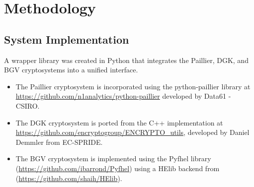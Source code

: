 \section{Methodology}
\label{sec:chapter_3}


\subsection{System Implementation}
A wrapper library was created in Python that integrates the Paillier, DGK, and BGV cryptosystems into a unified interface.
\begin{itemize}
	\item The Paillier cryptosystem is incorporated using the python-paillier library at \url{https://github.com/n1analytics/python-paillier} developed by Data61 - CSIRO.
	\item The DGK cryptosystem is ported from the C++ implementation at \url{https://github.com/encryptogroup/ENCRYPTO_utils}, developed by Daniel Demmler from EC-SPRIDE.
	\item The BGV cryptosystem is implemented using the Pyfhel library (\url{https://github.com/ibarrond/Pyfhel}) using a HElib backend from (\url{https://github.com/shaih/HElib}).
\end{itemize}

